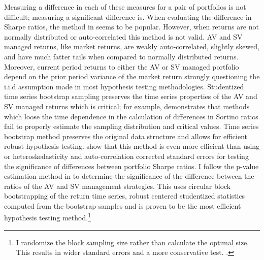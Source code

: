Measuring a difference in each of these measures for a pair of portfolios is not difficult; measuring a significant difference is.  When evaluating the difference in Sharpe ratios, the method in \citet{memmel_performance_2003} seems to be popular. However, when returns are not normally distributed or auto-correlated this method is not valid. AV and SV managed returns, like market returns, are weakly auto-correlated, slightly skewed, and have much fatter tails when compared to normally distributed returns. Moreover, current period returns to either the AV or SV managed portfolio depend on the prior period variance of the market return strongly questioning the i.i.d assumption made in most hypothesis testing methodologies. Studentized time series bootstrap sampling preserves the time series properties of the AV and SV managed returns which is critical; for example, \citet{scherer_alternative_2004} demonstrates that methods which loose the time dependence in the calculation of differences in Sortino ratios fail to properly estimate the sampling distribution and critical values. Time series bootstrap method preserves the original data structure and allows for efficient robust hypothesis testing. \citep{politis_stationary_1994,davison1997bootstrap} \citet{ledoit_robust_2008} show that this method is even more efficient than using \citet{newey_simple_1987} or \citet{andrews_improved_1992} heteroskedasticity and auto-correlation corrected standard errors for testing the significance of differences between portfolio Sharpe ratios. I follow the p-value estimation method in \citet{ledoit_robust_2008} to determine the significance of the difference between the ratios of the AV and SV management strategies. This uses circular block bootstrapping of the return time series, robust centered studentized statistics computed from the bootstrap samples and is proven to be the most efficient hypothesis testing method.\footnote{I randomize the block sampling size rather than calculate the optimal size. This results in wider standard errors and a more conservative test. \citet{lahiri_theoretical_1999}.} \citep{politis_general_1992,ledoit_robust_2008}

